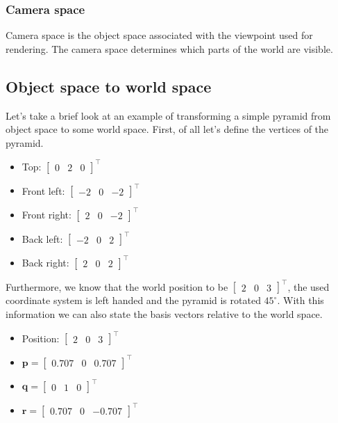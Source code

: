 \subsubsection{Camera space}

Camera space is the object space associated with the viewpoint used for rendering. The camera space determines which parts of the world are visible.

\subsection{Object space to world space}

Let's take a brief look at an example of transforming a simple pyramid from object space to some world space. First, of all let's define the vertices of the pyramid.

\begin{itemize}
	\item Top: $\begin{bmatrix}
		0 & 2 & 0
	\end{bmatrix}^\intercal$
	\item Front left: $\begin{bmatrix}
		-2 & 0 & -2
	\end{bmatrix}^\intercal$
	\item Front right: $\begin{bmatrix}
		2 & 0 & -2
	\end{bmatrix}^\intercal$
	\item Back left: $\begin{bmatrix}
		-2 & 0 & 2
	\end{bmatrix}^\intercal$
	\item Back right: $\begin{bmatrix}
		2 & 0 & 2
	\end{bmatrix}^\intercal$
\end{itemize}

Furthermore, we know that the world position to be $\begin{bmatrix}2 & 0 & 3\end{bmatrix}^\intercal$, the used coordinate system is left handed and the pyramid is rotated $45^\circ$. With this information we can also state the basis vectors relative to the world space.

\begin{itemize}
	\item Position: $\begin{bmatrix}2 & 0 & 3\end{bmatrix}^\intercal$
	\item $\textbf{p}=\begin{bmatrix}0.707 & 0 & 0.707\end{bmatrix}^\intercal$
	\item $\textbf{q}=\begin{bmatrix}0 & 1 & 0\end{bmatrix}^\intercal$
	\item $\textbf{r}=\begin{bmatrix}0.707 & 0 & -0.707\end{bmatrix}^\intercal$
\end{itemize}

